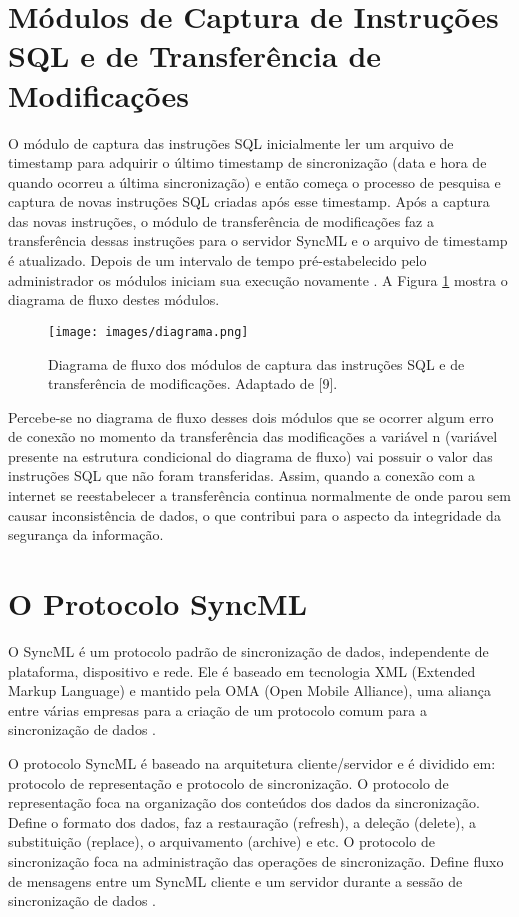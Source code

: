 \section{Módulos de Captura de Instruções SQL e de Transferência de Modificações}

O módulo de captura das instruções SQL inicialmente ler um arquivo de timestamp para adquirir o último timestamp de sincronização (data e hora de quando ocorreu a última sincronização) e então começa o processo de pesquisa e captura de novas instruções SQL criadas após esse timestamp. Após a captura das novas instruções, o módulo de transferência de modificações faz a transferência dessas instruções para o servidor SyncML e o arquivo de timestamp é atualizado. Depois de um intervalo de tempo pré-estabelecido pelo administrador os módulos iniciam sua execução novamente \cite{hossain}. A Figura \ref{fig:diagrama} mostra o diagrama de fluxo destes módulos.


\begin{figure}[ht]
\centering
\texttt{[image: images/diagrama.png]}
\caption{Diagrama de fluxo dos módulos de captura das instruções SQL e de transferência de modificações. Adaptado de [9].}
\label{fig:diagrama}
\end{figure}

Percebe-se no diagrama de fluxo desses dois módulos que se ocorrer algum erro de conexão no momento da transferência das modificações a variável n (variável presente na estrutura condicional do diagrama de fluxo) vai possuir o valor das instruções SQL que não foram transferidas. Assim, quando a conexão com a internet se reestabelecer a transferência continua normalmente de onde parou sem causar inconsistência de dados, o que contribui para o aspecto da integridade da segurança da informação.

\section{O Protocolo SyncML}

O SyncML é um protocolo padrão de sincronização de dados, independente de plataforma, dispositivo e rede. Ele é baseado em tecnologia XML (Extended Markup Language) e mantido pela OMA (Open Mobile Alliance), uma aliança entre várias empresas para a criação de um protocolo comum para a sincronização de dados \cite{ericsson} \cite{ericsson2}.

O protocolo SyncML é baseado na arquitetura cliente/servidor e é dividido em: protocolo de representação e protocolo de sincronização. O protocolo de representação foca na organização dos conteúdos dos dados da sincronização. Define o formato dos dados, faz a restauração (refresh), a deleção (delete), a substituição (replace), o arquivamento (archive) e etc. O protocolo de sincronização foca na administração das operações de sincronização. Define fluxo de mensagens entre um SyncML cliente e um servidor durante a sessão de sincronização de dados \cite{ericsson} \cite{ericsson2}.

